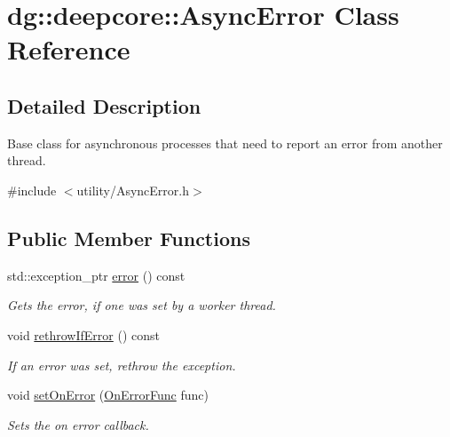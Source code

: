 \hypertarget{classdg_1_1deepcore_1_1_async_error}{}\section{dg\+:\+:deepcore\+:\+:Async\+Error Class Reference}
\label{classdg_1_1deepcore_1_1_async_error}


\subsection{Detailed Description}
Base class for asynchronous processes that need to report an error from another thread. 

{\ttfamily \#include $<$utility/\+Async\+Error.\+h$>$}

\subsection*{Public Member Functions}
\begin{DoxyCompactItemize}
\item 
std\+::exception\+\_\+ptr \hyperlink{classdg_1_1deepcore_1_1_async_error_a354a3ed3bdb3b9084602fc2ce2028478}{error} () const 
\begin{DoxyCompactList}\small\item\em Gets the error, if one was set by a worker thread. \end{DoxyCompactList}\item 
void \hyperlink{classdg_1_1deepcore_1_1_async_error_a4a111596085600b017485d15078760eb}{rethrow\+If\+Error} () const 
\begin{DoxyCompactList}\small\item\em If an error was set, rethrow the exception. \end{DoxyCompactList}\item 
void \hyperlink{classdg_1_1deepcore_1_1_async_error_aa71c047173cec3f535d24f67599d9a18}{set\+On\+Error} (\hyperlink{group___utility_module_ga21a199c126b87ba8bfe8ad7952dbaf3b}{On\+Error\+Func} func)
\begin{DoxyCompactList}\small\item\em Sets the on error callback. \end{DoxyCompactList}\end{DoxyCompactItemize}
